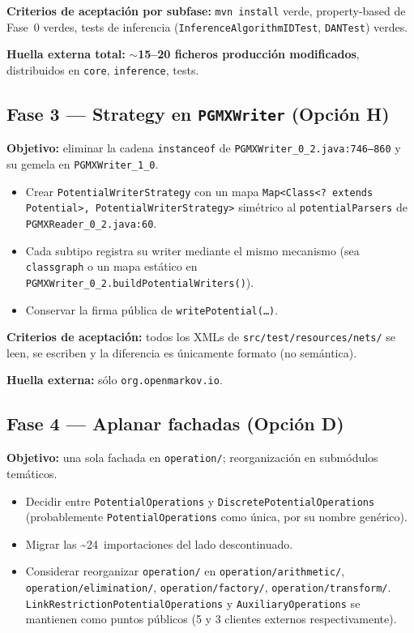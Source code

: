 \documentclass[11pt,a4paper]{article}
\newcommand{\code}[1]{\texttt{#1}}
\begin{document}
\textbf{Criterios de aceptación por subfase:} \code{mvn install} verde,
property-based de Fase~0 verdes, tests de inferencia
(\code{InferenceAlgorithmIDTest}, \code{DANTest}) verdes.

\textbf{Huella externa total:} \textbf{$\sim$15--20 ficheros producción
modificados}, distribuidos en \code{core}, \code{inference}, tests.

\subsection{Fase 3 --- Strategy en \code{PGMXWriter} (Opción H)}

\textbf{Objetivo:} eliminar la cadena \code{instanceof} de
\code{PGMXWriter\_0\_2.java:746--860} y su gemela en \code{PGMXWriter\_1\_0}.

\begin{itemize}[leftmargin=*]
  \item Crear \code{PotentialWriterStrategy} con un mapa
        \code{Map<Class<? extends Potential>, PotentialWriterStrategy>}
        simétrico al \code{potentialParsers} de \code{PGMXReader\_0\_2.java:60}.
  \item Cada subtipo registra su writer mediante el mismo mecanismo
        (sea \code{classgraph} o un mapa estático en
        \code{PGMXWriter\_0\_2.buildPotentialWriters()}).
  \item Conservar la firma pública de \code{writePotential(\dots)}.
\end{itemize}

\textbf{Criterios de aceptación:} todos los XMLs de
\code{src/test/resources/nets/} se leen, se escriben y la diferencia es
únicamente formato (no semántica).

\textbf{Huella externa:} sólo \code{org.openmarkov.io}.

\subsection{Fase 4 --- Aplanar fachadas (Opción D)}

\textbf{Objetivo:} una sola fachada en \code{operation/}; reorganización en
submódulos temáticos.

\begin{itemize}[leftmargin=*]
  \item Decidir entre \code{PotentialOperations} y
        \code{DiscretePotentialOperations} (probablemente \code{PotentialOperations}
        como única, por su nombre genérico).
  \item Migrar las \textasciitilde 24~importaciones del lado descontinuado.
  \item Considerar reorganizar \code{operation/} en
        \code{operation/arithmetic/}, \code{operation/elimination/},
        \code{operation/factory/}, \code{operation/transform/}.
        \code{LinkRestrictionPotentialOperations} y
        \code{AuxiliaryOperations} se mantienen como puntos públicos
        (5 y 3 clientes externos respectivamente).
\end{itemize}
\end{document}
